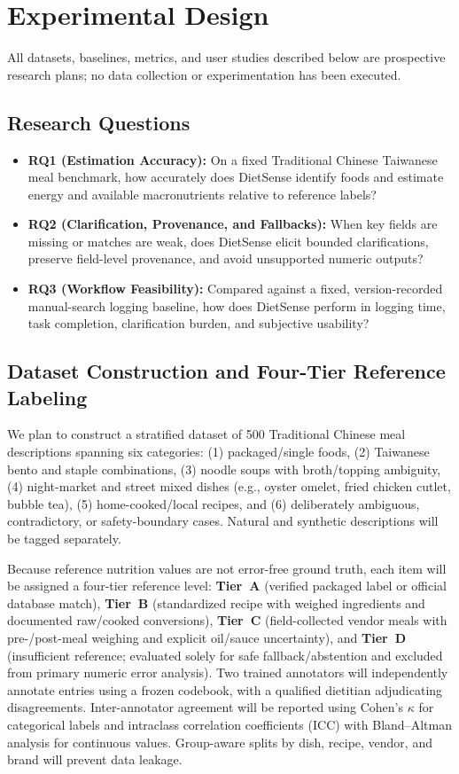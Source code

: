 \documentclass[conference]{IEEEtran}
\begin{document}
\section{Experimental Design}
All datasets, baselines, metrics, and user studies described below are prospective research plans; no data collection or experimentation has been executed.

\subsection{Research Questions}
\begin{itemize}
    \item \textbf{RQ1 (Estimation Accuracy):} On a fixed Traditional Chinese Taiwanese meal benchmark, how accurately does DietSense identify foods and estimate energy and available macronutrients relative to reference labels?
    \item \textbf{RQ2 (Clarification, Provenance, and Fallbacks):} When key fields are missing or matches are weak, does DietSense elicit bounded clarifications, preserve field-level provenance, and avoid unsupported numeric outputs?
    \item \textbf{RQ3 (Workflow Feasibility):} Compared against a fixed, version-recorded manual-search logging baseline, how does DietSense perform in logging time, task completion, clarification burden, and subjective usability?
\end{itemize}

\subsection{Dataset Construction and Four-Tier Reference Labeling}
We plan to construct a stratified dataset of 500 Traditional Chinese meal descriptions spanning six categories: (1) packaged/single foods, (2) Taiwanese bento and staple combinations, (3) noodle soups with broth/topping ambiguity, (4) night-market and street mixed dishes (e.g., oyster omelet, fried chicken cutlet, bubble tea), (5) home-cooked/local recipes, and (6) deliberately ambiguous, contradictory, or safety-boundary cases. Natural and synthetic descriptions will be tagged separately.

Because reference nutrition values are not error-free ground truth, each item will be assigned a four-tier reference level: \textbf{Tier~A} (verified packaged label or official database match), \textbf{Tier~B} (standardized recipe with weighed ingredients and documented raw/cooked conversions), \textbf{Tier~C} (field-collected vendor meals with pre-/post-meal weighing and explicit oil/sauce uncertainty), and \textbf{Tier~D} (insufficient reference; evaluated solely for safe fallback/abstention and excluded from primary numeric error analysis). Two trained annotators will independently annotate entries using a frozen codebook, with a qualified dietitian adjudicating disagreements. Inter-annotator agreement will be reported using Cohen's $\kappa$ for categorical labels and intraclass correlation coefficients (ICC) with Bland--Altman analysis for continuous values. Group-aware splits by dish, recipe, vendor, and brand will prevent data leakage.
\end{document}
